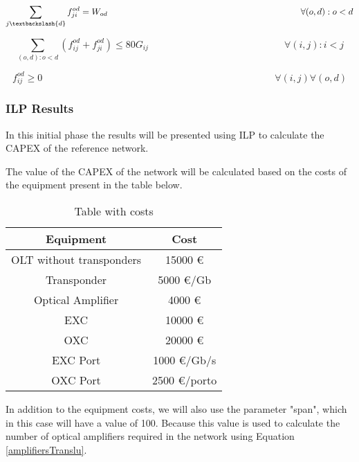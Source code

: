 \begin{equation}
\sum_{j \textbackslash \{d\} } f_{ji}^{od} = W_{od}
\qquad \qquad \qquad \qquad \qquad \qquad \qquad \qquad \qquad \qquad \qquad
\forall (o,d):o<d
\label{ILPTransluc8}
\end{equation}

\begin{equation}
\sum_{(o,d):o<d} \left( f_{ij}^{od} + f_{ji}^{od}\right) \leq 80 G_{ij}
\qquad \qquad \qquad \qquad \qquad \qquad \qquad
\forall (i,j) : i < j
\label{ILPTransluc9}
\end{equation}

\begin{equation}
f_{ij}^{od} \geq 0
\qquad \qquad \qquad \qquad \qquad \qquad \qquad \qquad \qquad \qquad \qquad \qquad
\forall (i,j) \forall (o,d)
\label{ILPTransluc10}
\end{equation}	


\subsubsection{ILP Results}

In this initial phase the results will be presented using ILP to calculate the CAPEX of the reference network.

The value of the CAPEX of the network will be calculated based on the costs of the equipment present in the table below.
\begin{table}[h!]
\centering
\begin{tabular}{|| c | c||}
 \hline
 Equipment & Cost \\
 \hline\hline
 OLT without transponders & 15000 \euro \\
 Transponder & 5000 \euro/Gb \\
 Optical Amplifier & 4000 \euro \\
 EXC & 10000 \euro \\
 OXC & 20000 \euro \\
 EXC Port & 1000 \euro /Gb/s\\
 OXC Port & 2500 \euro /porto \\
 \hline
\end{tabular}
\caption{Table with costs}
\label{table_cost3}
\end{table}

In addition to the equipment costs, we will also use the parameter "span", which in this case will have a value of 100.
Because this value is used to calculate the number of optical amplifiers required in the network using Equation \ref{amplifiersTranslu}.

